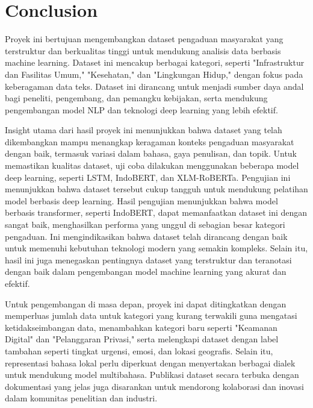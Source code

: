 \documentclass[12pt,a4paper]{article}
\begin{document}
\section{Conclusion}
\begin{adjustwidth}{3em}{0pt} 
    \hspace{0.5cm} Proyek ini bertujuan mengembangkan dataset pengaduan masyarakat yang terstruktur dan berkualitas tinggi untuk mendukung analisis data berbasis machine learning. Dataset ini mencakup berbagai kategori, seperti "Infrastruktur dan Fasilitas Umum," "Kesehatan," dan "Lingkungan Hidup," dengan fokus pada keberagaman data teks. Dataset ini dirancang untuk menjadi sumber daya andal bagi peneliti, pengembang, dan pemangku kebijakan, serta mendukung pengembangan model NLP dan teknologi deep learning yang lebih efektif.
    
    \hspace{0.5cm} Insight utama dari hasil proyek ini menunjukkan bahwa dataset yang telah dikembangkan mampu menangkap keragaman konteks pengaduan masyarakat dengan baik, termasuk variasi dalam bahasa, gaya penulisan, dan topik. Untuk memastikan kualitas dataset, uji coba dilakukan menggunakan beberapa model deep learning, seperti LSTM, IndoBERT, dan XLM-RoBERTa. Pengujian ini menunjukkan bahwa dataset tersebut cukup tangguh untuk mendukung pelatihan model berbasis deep learning. Hasil pengujian menunjukkan bahwa model berbasis transformer, seperti IndoBERT, dapat memanfaatkan dataset ini dengan sangat baik, menghasilkan performa yang unggul di sebagian besar kategori pengaduan. Ini mengindikasikan bahwa dataset telah dirancang dengan baik untuk memenuhi kebutuhan teknologi modern yang semakin kompleks. Selain itu, hasil ini juga menegaskan pentingnya dataset yang terstruktur dan teranotasi dengan baik dalam pengembangan model machine learning yang akurat dan efektif.
    
     \hspace{0.5cm} Untuk pengembangan di masa depan, proyek ini dapat ditingkatkan dengan memperluas jumlah data untuk kategori yang kurang terwakili guna mengatasi ketidakseimbangan data, menambahkan kategori baru seperti "Keamanan Digital" dan "Pelanggaran Privasi," serta melengkapi dataset dengan label tambahan seperti tingkat urgensi, emosi, dan lokasi geografis. Selain itu, representasi bahasa lokal perlu diperkuat dengan menyertakan berbagai dialek untuk mendukung model multibahasa. Publikasi dataset secara terbuka dengan dokumentasi yang jelas juga disarankan untuk mendorong kolaborasi dan inovasi dalam komunitas penelitian dan industri.
    \end{adjustwidth}
\end{document}
